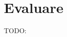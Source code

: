 \documentclass[12pt,a4paper]{report}
\begin{document}
\chapter{Evaluare}
TODO:
%
%
%
%
\end{document}
